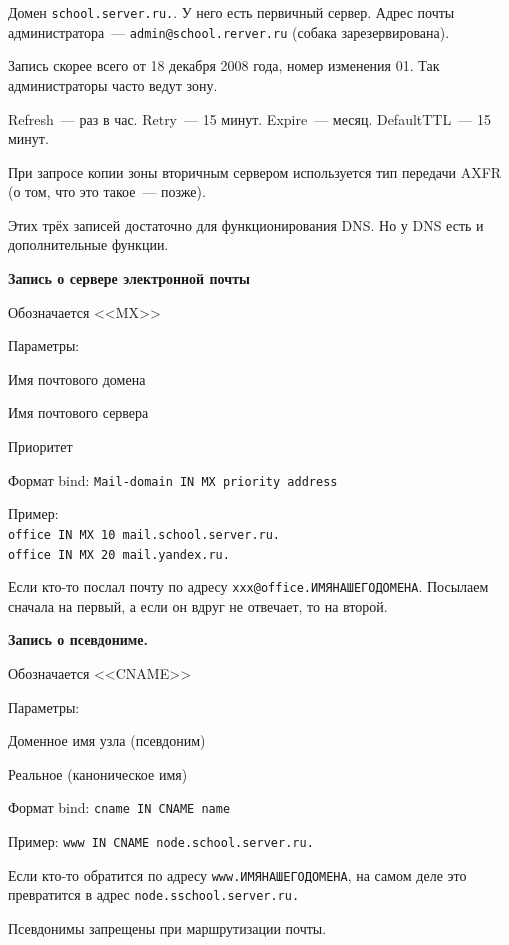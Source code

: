 Домен {\tt school.server.ru.}. У него есть первичный сервер. Адрес почты администратора~--- {\tt admin@school.rerver.ru} (собака зарезервирована).

Запись скорее всего от 18 декабря 2008 года, номер изменения 01. Так администраторы часто ведут зону.

Refresh~--- раз в час. Retry~--- 15 минут. Expire~--- месяц. DefaultTTL~--- 15 минут.

При запросе копии зоны вторичным сервером используется тип передачи AXFR (о том, что это такое~--- позже).

Этих трёх записей достаточно для функционирования DNS. Но у DNS есть и дополнительные функции.

{\bf Запись о сервере электронной почты}

Обозначается <<MX>>

Параметры:
 \begin{MyItemize}
    \item Имя почтового домена
    \item Имя почтового сервера
    \item Приоритет
\end{MyItemize}

Формат bind: {\tt Mail-domain IN MX priority address}

Пример: \\
{\tt office IN MX 10 mail.school.server.ru.}\\
{\tt office IN MX 20 mail.yandex.ru.}

Если кто-то послал почту по адресу {\tt xxx@office.ИМЯНАШЕГОДОМЕНА}. Посылаем сначала на первый, а если он вдруг не отвечает, то на второй.

{\bf Запись о псевдониме.}

Обозначается <<CNAME>>

Параметры:
\begin{MyItemize}
    \item Доменное имя узла (псевдоним)
    \item Реальное (каноническое имя)
\end{MyItemize}

Формат bind: {\tt сname IN CNAME name}

Пример: {\tt www IN CNAME node.school.server.ru.}

Если кто-то обратится по адресу {\tt www.ИМЯНАШЕГОДОМЕНА}, на самом деле это превратится в адрес {\tt node.sschool.server.ru.}

Псевдонимы запрещены при маршрутизации почты.

